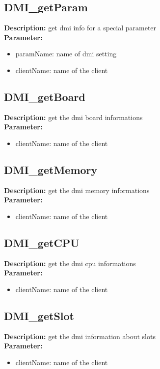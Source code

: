 \subsection{DMI\_getParam}
\textbf{Description:} get dmi info for a special parameter\\
\textbf{Parameter:}
\begin{itemize}
\item paramName: name of dmi setting
\item clientName: name of the client
\end{itemize}

\subsection{DMI\_getBoard}
\textbf{Description:} get the dmi board informations\\
\textbf{Parameter:}
\begin{itemize}
\item clientName: name of the client
\end{itemize}

\subsection{DMI\_getMemory}
\textbf{Description:} get the dmi memory informations\\
\textbf{Parameter:}
\begin{itemize}
\item clientName: name of the client
\end{itemize}

\subsection{DMI\_getCPU}
\textbf{Description:} get the dmi cpu informations\\
\textbf{Parameter:}
\begin{itemize}
\item clientName: name of the client
\end{itemize}

\subsection{DMI\_getSlot}
\textbf{Description:} get the dmi information about slots\\
\textbf{Parameter:}
\begin{itemize}
\item clientName: name of the client
\end{itemize}

